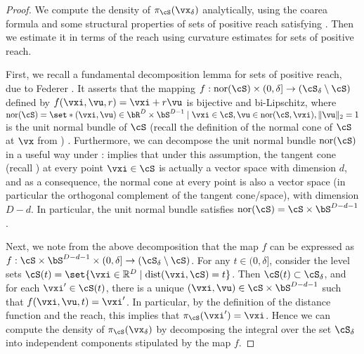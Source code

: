 \documentclass[../../book-main.tex]{subfiles}
\begin{document}
\begin{proof}
    We compute the density of $\pi_{\cS}(\vx_{\delta})$ analytically, using the
    coarea formula and some structural properties of sets of positive reach
    satisfying . Then we estimate it in terms of
    the reach using curvature estimates for sets of positive reach. 

    First, we recall a fundamental decomposition lemma for sets of positive
    reach, due to Federer \cite{Federer1959-gk}. It asserts that the mapping
    $f : \mathrm{nor}(\cS) \times (0, \delta] \to (\cS_{\delta} \setminus \cS)$
    defined by $f(\vxi, \vu, r) = \vxi + r \vu$ is bijective and bi-Lipschitz,
    where $\mathrm{nor}(\cS) = \set*{(\vxi, \vu) \in \bR^D \times \bS^{D-1}
    \given \vxi \in \cS, \vu \in \mathrm{nor}(\cS, \vxi), \norm{\vu}_2 = 1}$ is the unit
    normal bundle of $\cS$ (recall the definition of the normal cone of $\cS$ at
    $\vx$ from ) \cite[Proposition 16]{Thale2008-sv}.
    Furthermore, we can decompose the unit normal bundle $\mathrm{nor}(\cS)$ in
    a useful way under : \cite[Remark
    4.15(4)]{Federer1959-gk} implies that under this assumption, the tangent
    cone (recall ) at every point $\vxi \in \cS$ is
    actually a vector space with dimension $d$, and as a consequence, the normal
    cone at every point is also a vector space (in particular the orthogonal
    complement of the tangent cone/space), with dimension $D-d$. In particular,
    the unit normal bundle satisfies $\mathrm{nor}(\cS) = \cS \times
    \bS^{D-d-1}$ .

    Next, we note from the above decomposition that the map $f$ can be expressed
    as $f : \cS \times \bS^{D - d - 1} \times (0, \delta] \to (\cS_{\delta}
    \setminus \cS)$. For any $t \in (0, \delta]$, consider the level sets
    $\cS(t) = \set{\vxi \in \R^D \mid \dist(\vxi, \cS) = t}$. Then $\cS(t) \subset
    \cS_{\delta}$, and for each $\vxi' \in \cS(t)$, there is a unique $(\vxi,
    \vu) \in \cS \times \bS^{D-d-1}$ such that $f(\vxi, \vu, t) = \vxi'$.
    In particular, by the definition of the distance function and the reach,
    this implies that $\pi_{\cS}(\vxi') = \vxi$.
    Hence we can compute the density of $\pi_{\cS}(\vx_{\delta})$ by
    decomposing the integral over the set $\cS_{\delta}$ into independent
    components stipulated by the map $f$.


\end{proof}
\end{document}
